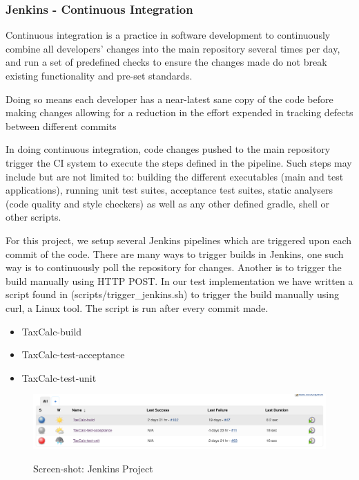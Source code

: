 \subsubsection{Jenkins - Continuous Integration}
Continuous integration is a practice in software development to continuously combine all developers’ changes into the main repository several times per day, and run a set of predefined checks to ensure the changes made do not break existing functionality and pre-set standards. 
\par
Doing so means each developer has a near-latest sane copy of the code before making changes allowing for a reduction in the effort expended in tracking defects between different commits  
\par
In doing continuous integration, code changes pushed to the main repository  trigger the CI system to execute the steps defined in the pipeline.
Such steps may include but are not limited to: building the different executables (main and test applications), running unit test suites, acceptance test suites, static analysers (code quality and style checkers) as well as any other defined gradle, shell or other scripts.  
\par
For this project, we setup several Jenkins pipelines which are triggered upon each commit of the code. There are many ways to trigger builds in Jenkins, one such way is to continuously poll the repository for changes. 
Another is to trigger the build manually using HTTP POST. In our test implementation we have written a script found in (scripts/trigger\_jenkins.sh) to trigger the build manually using curl, a Linux tool. The script is run after every commit made. 
\begin{itemize}
    \item TaxCalc-build
	\item TaxCalc-test-acceptance
	\item TaxCalc-test-unit
\end{itemize}

\begin{figure}[H]
\includegraphics[scale=0.4]{res/jenkins.png}
\label{fig:jenkins-screenshot}
\caption{Screen-shot: Jenkins Project}
\end{figure}
